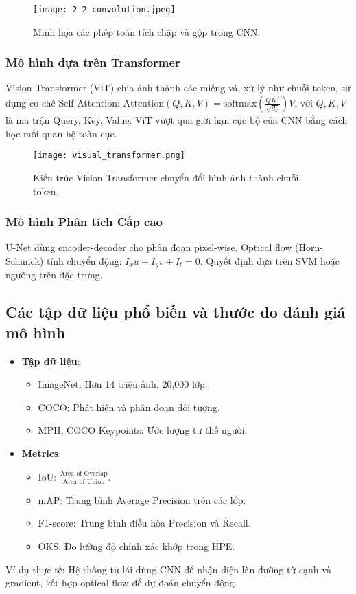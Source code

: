 \begin{figure}[h]
    \centering
    \texttt{[image: 2\_2\_convolution.jpeg]}
    \caption{Minh họa các phép toán tích chập và gộp trong CNN.}
    \label{fig:cnn_ops}
\end{figure}

\subsubsection{Mô hình dựa trên Transformer}
Vision Transformer (ViT) chia ảnh thành các miếng vá, xử lý như chuỗi token, sử dụng cơ chế Self-Attention: $\text{Attention}(Q, K, V) = \text{softmax}\left(\frac{QK^T}{\sqrt{d_k}}\right)V$, với $Q, K, V$ là ma trận Query, Key, Value.\autocite{dosovitskiy2021} ViT vượt qua giới hạn cục bộ của CNN bằng cách học mối quan hệ toàn cục.

\begin{figure}[h]
    \centering
    \texttt{[image: visual\_transformer.png]}
    \caption{Kiến trúc Vision Transformer chuyển đổi hình ảnh thành chuỗi token.}
    \label{fig:vit_arch}
\end{figure}

\subsubsection{Mô hình Phân tích Cấp cao}
U-Net dùng encoder-decoder cho phân đoạn pixel-wise.\autocite{ronneberger2015} Optical flow (Horn-Schunck) tính chuyển động: $I_x u + I_y v + I_t = 0$.\autocite{horn1981} Quyết định dựa trên SVM hoặc ngưỡng trên đặc trưng.\autocite{szeliski2010}

\subsection{Các tập dữ liệu phổ biến và thước đo đánh giá mô hình}
\begin{itemize}
    \item \textbf{Tập dữ liệu}:
    \begin{itemize}
        \item ImageNet: Hơn 14 triệu ảnh, 20,000 lớp.\autocite{deng2009}
        \item COCO: Phát hiện và phân đoạn đối tượng.\autocite{lin2014}
        \item MPII, COCO Keypoints: Ước lượng tư thế người.\autocite{lin2014}
    \end{itemize}
    \item \textbf{Metrics}:
    \begin{itemize}
        \item IoU: $\frac{\text{Area of Overlap}}{\text{Area of Union}}$.\autocite{lin2014}
        \item mAP: Trung bình Average Precision trên các lớp.\autocite{lin2014}
        \item F1-score: Trung bình điều hòa Precision và Recall.\autocite{szeliski2010}
        \item OKS: Đo lường độ chính xác khớp trong HPE.\autocite{lin2014}
    \end{itemize}
\end{itemize}

Ví dụ thực tế: Hệ thống tự lái dùng CNN để nhận diện làn đường từ cạnh và gradient, kết hợp optical flow để dự đoán chuyển động.\autocite{redmon2016}
